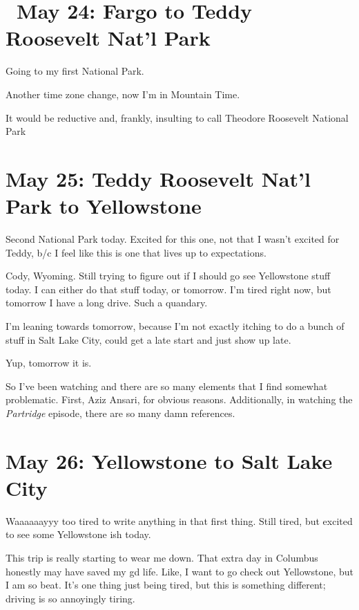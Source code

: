 \documentclass[../butidigress.tex]{subfiles}
\begin{document}
\section{\ May 24: Fargo to Teddy Roosevelt Nat'l Park}
Going to my first National Park.

\entryskip

Another time zone change, now I'm in Mountain Time.

It would be reductive and, frankly, insulting to call Theodore Roosevelt National Park 

\section{May 25: Teddy Roosevelt Nat'l Park to Yellowstone}
Second National Park today.
Excited for this one, not that I wasn't excited for Teddy, b/c I feel like this is one that lives up to expectations.

\entryskip

Cody, Wyoming.
Still trying to figure out if I should go see Yellowstone stuff today.
I can either do that stuff today, or tomorrow.
I'm tired right now, but tomorrow I have a long drive.
Such a quandary.

I'm leaning towards tomorrow, because I'm not exactly itching to do a bunch of stuff in Salt Lake City, could get a late start and just show up late.

Yup, tomorrow it is.

So I've been watching  and there are so many elements that I find somewhat problematic.
First, Aziz Ansari, for obvious reasons.
Additionally, in watching the \textit{Partridge} episode, there are so many damn  references.

\section{May 26: Yellowstone to Salt Lake City}

\entryskip

Waaaaaayyy too tired to write anything in that first thing.
Still tired, but excited to see some Yellowstone ish today.

This trip is really starting to wear me down.
That extra day in Columbus honestly may have saved my gd life.
Like, I want to go check out Yellowstone, but I am so beat.
It's one thing just being tired, but this is something different; driving is so annoyingly tiring.
\end{document}
